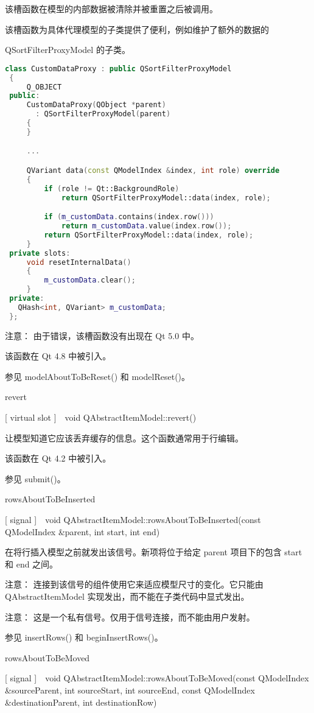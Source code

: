 该槽函数在模型的内部数据被清除并被重置之后被调用。

该槽函数为具体代理模型的子类提供了便利，例如维护了额外的数据的

QSortFilterProxyModel 的子类。

\begin{lstlisting}[language=C++]
 class CustomDataProxy : public QSortFilterProxyModel
 {
     Q_OBJECT
 public:
     CustomDataProxy(QObject *parent)
       : QSortFilterProxyModel(parent)
     {
     }

     ...

     QVariant data(const QModelIndex &index, int role) override
     {
         if (role != Qt::BackgroundRole)
             return QSortFilterProxyModel::data(index, role);

         if (m_customData.contains(index.row()))
             return m_customData.value(index.row());
         return QSortFilterProxyModel::data(index, role);
     }
 private slots:
     void resetInternalData()
     {
         m_customData.clear();
     }
 private:
   QHash<int, QVariant> m_customData;
 };
\end{lstlisting}

注意： 由于错误，该槽函数没有出现在 Qt 5.0 中。

该函数在 Qt 4.8 中被引入。

参见 modelAboutToBeReset() 和 modelReset()。

revert

[ virtual slot ] void QAbstractItemModel::revert()

让模型知道它应该丢弃缓存的信息。这个函数通常用于行编辑。

该函数在 Qt 4.2 中被引入。

参见 submit()。

rowsAboutToBeInserted

[ signal ] void QAbstractItemModel::rowsAboutToBeInserted(const QModelIndex \&parent, int start, int end)

在将行插入模型之前就发出该信号。新项将位于给定 parent 项目下的包含 start 和 end 之间。

注意： 连接到该信号的组件使用它来适应模型尺寸的变化。它只能由 QAbstractItemModel 实现发出，而不能在子类代码中显式发出。

注意： 这是一个私有信号。仅用于信号连接，而不能由用户发射。

参见 insertRows() 和 beginInsertRows()。

rowsAboutToBeMoved

[ signal ] void QAbstractItemModel::rowsAboutToBeMoved(const QModelIndex \&sourceParent, int sourceStart, int sourceEnd, const QModelIndex \&destinationParent, int destinationRow)

